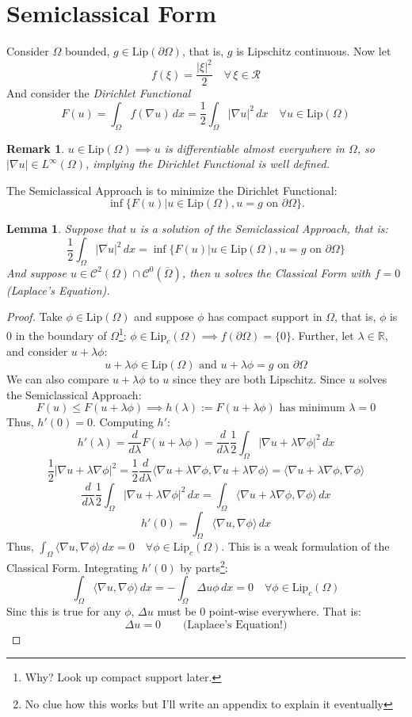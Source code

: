 \documentclass[12pt]{article}
\newtheorem*{remark}{Remark}
\newtheorem{lemma}{Lemma}[section]
\begin{document}
\section{Semiclassical Form}
Consider $\Omega$ bounded, $g\in\text{Lip}(\partial\Omega)$, that is, $g$ is Lipschitz continuous. Now let
 \[
     f(\xi)=\frac{|\xi|^2}{2}\quad\forall\,\xi\in\mathcal{R}
\]
And consider the \emph{Dirichlet Functional} 
\[
    F(u)=\int_\Omega f(\nabla u)\,dx=\frac{1}{2}\int_\Omega |\nabla u|^2\,dx\quad \forall u\in\text{Lip}(\Omega)
\] 
\begin{remark}
    $u\in\text{Lip}(\Omega)\implies u$ is differentiable almost everywhere in $\Omega$, so $|\nabla u|\in L^{\infty}(\Omega)$, implying the Dirichlet Functional is well defined.
\end{remark}
\label{sec:semiclassical_form}
The Semiclassical Approach is to minimize the Dirichlet Functional:
\[
    \inf\{F(u)|u\in\text{Lip}(\Omega), u=g \text{ on }\partial\Omega\}
.\] 
\begin{lemma}
Suppose that $u$ is a solution of the Semiclassical Approach, that is:
\[
    \frac{1}{2}\int_\Omega |\nabla u|^2\,dx= \inf\{F(u)|u\in\text{Lip}(\Omega), u=g \text{ on }\partial\Omega\}
\] 
And suppose $u\in\mathcal{C}^2(\Omega)\cap\mathcal{C}^{0}(\overline{\Omega})$, then $u$ solves the Classical Form with $f=0$ (Laplace's Equation).
\end{lemma}
\begin{proof}
    Take $\phi\in\text{Lip}(\Omega)$ and suppose $\phi$ has compact support in $\Omega$, that is, $\phi$ is 0 in the boundary of $\Omega$\footnote{Why? Look up compact support later.}: $\phi\in\text{Lip}_c(\Omega)\implies f(\partial\Omega)=\{0\}$. Further, let $\lambda\in\mathbb{R}$, and consider $u+\lambda\phi$:
    \[
        u+\lambda\phi\in\text{Lip}(\Omega)
        \text{ and }
        u+\lambda\phi=g \text{ on } \partial\Omega
\]
We can also compare $u+\lambda\phi$ to $u$ since they are both Lipschitz. Since $u$ solves the Semiclassical Approach:
\[
    F(u)\le F(u+\lambda\phi)\implies h(\lambda):=F(u+\lambda\phi)\text{ has minimum }\lambda=0
\]
Thus, $h'(0)=0$. Computing $h'$:
\[
    h'(\lambda)=
    \frac{d}{d\lambda }F(u+\lambda\phi)=
    \frac{d}{d\lambda } \frac{1}{2}
    \int_\Omega |\nabla u + \lambda\nabla \phi|^2\,dx
\]
\[
    \frac{1}{2}|\nabla u +\lambda\nabla \phi|^2=
    \frac{1}{2}\frac{d}{d\lambda}\langle\nabla u + \lambda\nabla \phi, \nabla u + \lambda\nabla \phi\rangle=\langle\nabla u+\lambda\nabla \phi,\nabla \phi\rangle
\]
\[
    \frac{d}{d\lambda}\frac{1}{2}\int_\Omega |\nabla u + \lambda\nabla \phi|^2\,dx=\int_\Omega \langle\nabla u+\lambda\nabla \phi, \nabla \phi\rangle\,dx
\] 
\[
h'(0)=\int_\Omega\langle\nabla u,\nabla \phi\rangle\,dx
\] 
Thus, $\int_\Omega\langle\nabla u,\nabla \phi\rangle\,dx=0 \quad\forall\phi\in\text{Lip}_c(\Omega)$. This is a weak formulation of the Classical Form. Integrating $h'(0)$ by parts\footnote{No clue how this works but I'll write an appendix to explain it eventually}:
\[
\int_\Omega\langle\nabla u, \nabla \phi\rangle\,dx=
-\int_\Omega\Delta u\phi\,dx=0\quad \forall \phi\in\text{Lip}_c(\Omega)
\] 
Sinc this is true for any $\phi$, $\Delta u$ must be 0 point-wise everywhere. That is:
\[
    \Delta u= 0 \qquad\text{(Laplace's Equation!)}
\] 
\end{proof}
\end{document}
